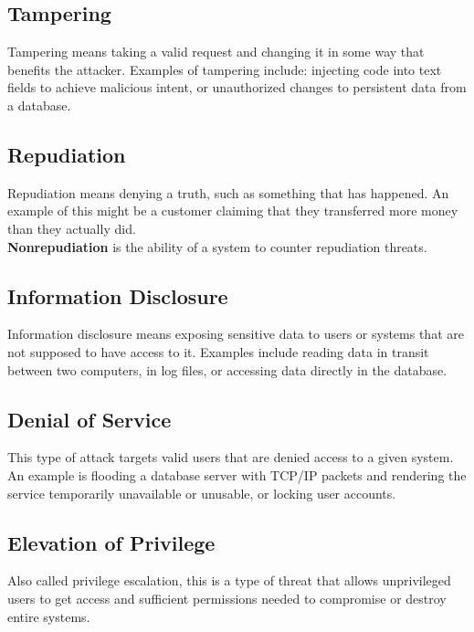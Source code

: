 \documentclass[a5paper,pagesize,10pt,bibtotoc,DIV=10,twoside]{scrbook}
\begin{document}
\subsection{Tampering}

Tampering means taking a valid request and changing it in some way that benefits the attacker.  Examples of tampering include: injecting code into text fields to achieve malicious intent, or unauthorized changes to persistent data from a database. 

\subsection{Repudiation}

Repudiation means denying a truth, such as something that has happened.  An example of this might be a customer claiming that they transferred more money than they actually did.\\
\textbf{Nonrepudiation} is the ability of a system to counter repudiation threats.

\subsection{Information Disclosure}

Information disclosure means exposing sensitive data to users or systems that are not supposed to have access to it. Examples include reading data in transit between two computers, in log files, or accessing data directly in the database. 

\subsection{Denial of Service}

This type of attack targets valid users that are denied access to a given system. An example is flooding a database server with TCP/IP packets and rendering the service temporarily unavailable or unusable, or locking user accounts.

\subsection{Elevation of Privilege}

Also called privilege escalation, this is a type of threat that allows unprivileged users to get access and sufficient permissions needed to compromise or destroy entire systems. 


\end{document}
